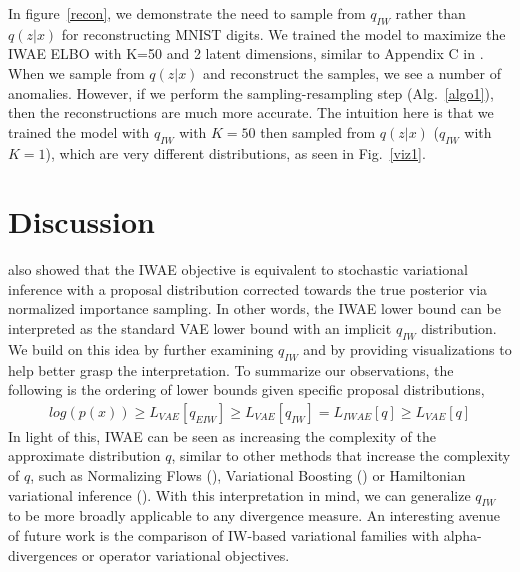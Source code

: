 \documentclass{article} %
\begin{document}
In figure~\ref{recon}, we demonstrate the need to sample from $q_{IW}$ rather than $q(z|x)$ for reconstructing MNIST digits.
We trained the model to maximize the IWAE ELBO with K=50 and 2 latent dimensions, similar to Appendix C in \citet{burda2015importance}. When we sample from $q(z|x)$ and reconstruct the samples, we see a number of anomalies.
However, if we perform the sampling-resampling step (Alg.~\ref{algo1}), then the reconstructions are much more accurate.
The intuition here is that we trained the model with $q_{IW}$ with $K=50$ then sampled from $q(z|x)$ ($q_{IW}$ with $K=1$), which are very different distributions, as seen in Fig.~\ref{viz1}.



\section{Discussion}
\cite{bachman} also showed that the IWAE objective is equivalent to stochastic variational inference with a proposal distribution corrected towards the true posterior via normalized importance sampling. In other words, the IWAE lower bound can be interpreted as the standard VAE lower bound with an implicit $q_{IW}$ distribution. We build on this idea by further examining $q_{IW}$ and by providing visualizations to help better grasp the interpretation. To summarize our observations, the following is the ordering of lower bounds given specific proposal distributions,
\begin{align} 
    log(p(x)) \geq L_{VAE}[q_{EIW}] \geq L_{VAE}[q_{IW}] = L_{IWAE}[q]  \geq L_{VAE}[q] \nonumber
\end{align}
In light of this, IWAE can be seen as increasing the complexity of the approximate distribution $q$, similar to other methods that increase the complexity of $q$, such as Normalizing Flows (\cite{normflow}), Variational Boosting (\cite{varboosting}) or Hamiltonian variational inference (\cite{salimans2015markov}).
With this interpretation in mind, we can generalize $q_{IW}$ to be more broadly applicable to any divergence measure.
An interesting avenue of future work is the comparison of IW-based variational families with alpha-divergences or operator variational objectives. 
\end{document}
